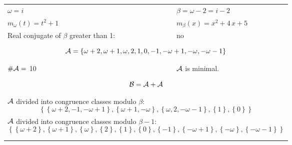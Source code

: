 \begin{exmp}
\label{ex:compareAQ}


\rule{0cm}{0cm}

\begin{tabular}{ll}
$\omega=  i $  & $\beta= \omega - 2 = i - 2 $\\
$m_\omega(t)=  t^{2} + 1 $  & $m_\beta(x)=  x^{2} + 4 \, x + 5 $\\
Real conjugate of $\beta$ greater than 1:   &  no \\ \hline
\multicolumn{2}{l}{\begin{minipage}{\textwidth}\begin{dmath*}\A = \left\{\omega + 2, \omega + 1, \omega, 2, 1, 0, -1, -\omega + 1, -\omega, -\omega - 1\right\}  \end{dmath*}\end{minipage} }\\
$\#\mathcal{A}= $ 10 $ $ & $\mathcal{A}$ is minimal. \\
\multicolumn{2}{l}{\begin{minipage}{\textwidth}\begin{dmath*}\B =\A+\A \end{dmath*}\end{minipage} }\\[10pt]
\multicolumn{2}{l}{\begin{minipage}{\textwidth}$\mathcal{A}$ divided into congruence classes modulo $\beta$: \begin{dmath*} \left\{\left\{\omega + 2, -1, -\omega + 1\right\}, \left\{\omega + 1, -\omega\right\}, \left\{\omega, 2, -\omega - 1\right\}, \left\{1\right\}, \left\{0\right\}\right\}  \end{dmath*}\end{minipage} }\\[10pt]
\multicolumn{2}{l}{\begin{minipage}{\textwidth}$\mathcal{A}$ divided into congruence classes modulo $\beta-1$: \begin{dmath*} \left\{\left\{\omega + 2\right\}, \left\{\omega + 1\right\}, \left\{\omega\right\}, \left\{2\right\}, \left\{1\right\}, \left\{0\right\}, \left\{-1\right\}, \left\{-\omega + 1\right\}, \left\{-\omega\right\}, \left\{-\omega - 1\right\}\right\}  \end{dmath*}\end{minipage} }\\
 & \\ \hline
 & \\
\end{tabular}


\end{exmp}
